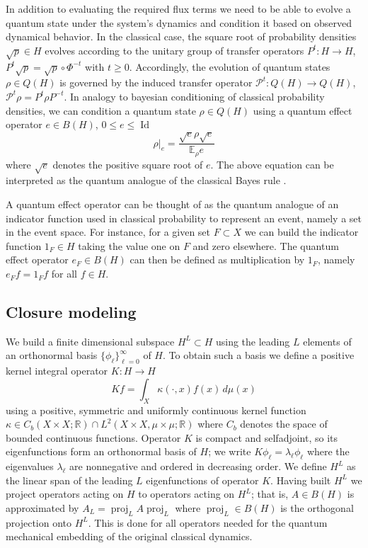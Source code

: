 \documentclass[letterpaper,10pt,3p,preprint]{elsarticle}
\newcommand{\Rbb}{\mathbb{R}}
\newcommand{\Ebb}{\mathbb{E}}
\DeclareMathOperator{\Id}{Id}
\DeclareMathOperator{\proj}{proj}
\begin{document}
In addition to evaluating the required flux terms we need to be
able to evolve a quantum state under the system's dynamics
and condition it based on observed dynamical behavior.
In the classical case, the square root of probability densities
$\sqrt{p}\in H$
evolves according to the unitary group of transfer operators
$P^t\colon H\to H$,
$P^t\sqrt{p}=\sqrt{p}\circ\Phi^{-t}$ with $t\geq 0$.
Accordingly, the evolution of quantum states $\rho\in Q(H)$
is governed by the induced transfer operator
$\mathcal{P}^t\colon Q(H)\to Q(H)$,
$\mathcal{P}^t\rho=P^t\rho P^{-t}$.
In analogy to bayesian conditioning of classical probability
densities, we can condition a quantum state $\rho\in Q(H)$
using a quantum effect operator $e\in B(H)$, $0\leq e\leq\Id$
\begin{equation}\label{eq:quantum-bayes}
    \rho|_e=\frac{\sqrt{e}\rho\sqrt{e}}{\Ebb_\rho e}
\end{equation}
where $\sqrt{e}$ denotes the positive square root of $e$.
The above equation can be interpreted as the quantum
analogue of the classical Bayes rule
\cite{Freeman2024}.

A quantum effect operator can be thought of as the quantum analogue
of an indicator function used in classical probability to
represent an event, namely a set in the event space.
For instance, for a given set $F\subset X$ we can build the
indicator function $1_F\in H$ taking the value one on $F$
and zero elsewhere.
The quantum effect operator $e_F\in B(H)$ can then be defined
as multiplication by $1_F$, namely
$e_Ff=1_Ff$ for all $f\in H$.

\subsection{Closure modeling}\label{sec:qmcl-finite}
We build a finite dimensional subspace $H^L\subset H$
using the leading $L$ elements of an orthonormal basis
$\{\phi_\ell\}_{\ell=0}^\infty$ of $H$.
To obtain such a basis we define a positive kernel
integral operator $K\colon H\to H$
\begin{equation*}
    Kf=\int_X\kappa(\cdot,x)f(x)\,d\mu(x)
\end{equation*}
using a positive, symmetric and uniformly continuous
kernel function
$\kappa\in C_b(X\times X;\Rbb)\cap L^2(X\times X,\mu\times\mu;\Rbb)$
where $C_b$ denotes the space of bounded continuous functions.
Operator $K$ is compact and selfadjoint, so its eigenfunctions
form an orthonormal basis of $H$;
we write $K\phi_\ell=\lambda_\ell\phi_\ell$
where the eigenvalues $\lambda_\ell$
are nonnegative and ordered in decreasing order.
We define $H^L$ as the linear span of the leading $L$ eigenfunctions
of operator $K$.
Having built $H^L$ we project operators acting on $H$ to
operators acting on $H^L$;
that is, $A\in B(H)$ is approximated by $A_L=\proj_LA\proj_L$ where
$\proj_L\in B(H)$ is the orthogonal projection onto $H^L$.
This is done for all operators needed for the quantum mechanical
embedding of the original classical dynamics.
\end{document}
